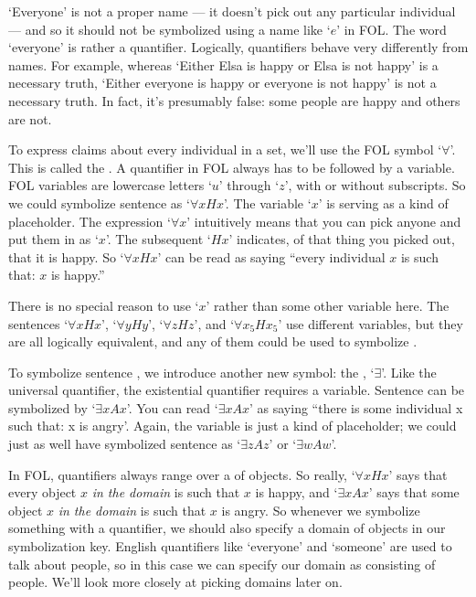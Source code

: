 `Everyone' is not a proper name --- it doesn't pick out any particular individual --- and so it should not be symbolized using a name like `$e$' in FOL.  The word `everyone' is rather a quantifier.  Logically, quantifiers behave very differently from names.  For example, whereas `Either Elsa is happy or Elsa is not happy' is a necessary truth, `Either everyone is happy or everyone is not happy' is not a necessary truth.  In fact, it's presumably false: some people are happy and others are not.

To express claims about every individual in a set, we'll use the FOL symbol `$\forall$'.  This is called the .  A quantifier in FOL always has to be followed by a variable. FOL variables are lowercase letters `$u$' through `$z$', with or without subscripts. So we could symbolize sentence  as `$\forall x Hx$'.  The variable `$x$' is serving as a kind of placeholder. The expression `$\forall x$' intuitively means that you can pick anyone and put them in as `$x$'. The subsequent `$Hx$' indicates, of that thing you picked out, that it is happy.  So `$\forall x Hx$' can be read as saying ``every individual $x$ is such that: $x$ is happy.''

There is no special reason to use `$x$' rather than some other variable here. The sentences `$\forall x Hx$', `$\forall y Hy$', `$\forall z Hz$', and `$\forall x_5 Hx_5$' use different variables, but they are all logically equivalent, and any of them could be used to symbolize .

To symbolize sentence , we introduce another new symbol: the , `$\exists$'. Like the universal quantifier, the existential quantifier requires a variable. Sentence  can be symbolized by `$\exists x Ax$'. You can read `$\exists x Ax$' as saying ``there is some individual x such that: x is angry'. Again, the variable is just a kind of placeholder; we could just as well have symbolized sentence  as `$\exists z Az$' or `$\exists w Aw$'.

In FOL, quantifiers always range over a  of objects.  So really, `$\forall xHx$' says that every object $x$ \emph{in the domain} is such that $x$ is happy, and `$\exists xAx$' says that some object $x$ \emph{in the domain} is such that $x$ is angry.  So whenever we symbolize something with a quantifier, we should also specify a domain of objects in our symbolization key.  English quantifiers like `everyone' and `someone' are used to talk about people, so in this case we can specify our domain as consisting of people.  We'll look more closely at picking domains later on.



